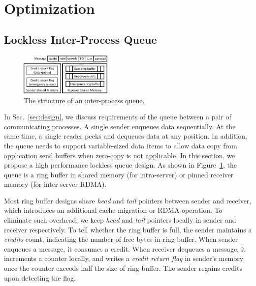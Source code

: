 \section{Optimization}
\label{sec:optimization}

\subsection{Lockless Inter-Process Queue}
\label{subsec:lockless-queue}

\begin{figure}[t]
	\centering
	\includegraphics[width=0.4\textwidth]{images/locklessq_new}
	\caption{The structure of an inter-process queue.}
	\vspace{-15pt}
	\label{fig:locklessq-structure}
\end{figure}

In Sec.~\ref{sec:design}, we discuss requirements of the queue between a pair of communicating processes. A single sender enqueues data sequentially. At the same time, a single reader peeks and dequeues data at any position. In addition, the queue needs to support variable-sized data items to allow data copy from application send buffers when zero-copy is not applicable. In this section, we propose a high performance lockless queue design. As shown in Figure~\ref{fig:locklessq-structure}, the queue is a ring buffer in shared memory (for intra-server) or pinned receiver memory (for inter-server RDMA).

Most ring buffer designs share \textit{head} and \textit{tail} pointers between sender and receiver, which introduces an additional cache migration or RDMA operation. To eliminate such overhead, we keep \textit{head} and \textit{tail} pointers locally in sender and receiver respectively.
To tell whether the ring buffer is full, the sender maintains a \textit{credits} count, indicating the number of free bytes in ring buffer. When sender enqueues a message, it consumes a credit. When receiver dequeues a message, it increments a counter locally, and writes a \textit{credit return flag} in sender's memory once the counter exceeds half the size of ring buffer. The sender regains credits upon detecting the flag.

